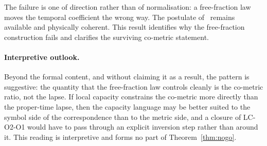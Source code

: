 \documentclass[12pt,a4paper]{article}
\theoremstyle{remark}
\theoremstyle{definition}
\begin{document}
    The failure is one of direction rather than of normalisation: a free-fraction law moves the
    temporal coefficient the wrong way.
    The postulate of~\cite{Beau2026lco2} remains available and physically coherent.
    This result identifies why the free-fraction construction fails and clarifies the surviving
    co-metric statement.

    \paragraph{Interpretive outlook.}
      Beyond the formal content, and without claiming it as a result, the pattern is suggestive: the
      quantity that the free-fraction law controls cleanly is the co-metric ratio, not the lapse.
      If local capacity constrains the co-metric more directly than the proper-time lapse, then the
      capacity language may be better suited to the symbol side of the correspondence than to the
      metric side, and a closure of LC-O2-O1 would have to pass through an explicit inversion step
      rather than around it.
      This reading is interpretive and forms no part of Theorem~\ref{thm:nogo}.

    
    
\end{document}
